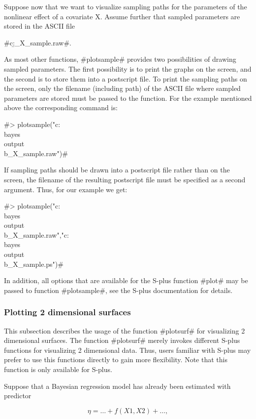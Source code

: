 Suppose now that we want to visualize sampling paths for the
parameters of the nonlinear effect of a covariate X. Assume
further that sampled parameters are stored in the ASCII file

#c:\bayes\output\b_X_sample.raw#.

As most other functions, #plotsample# provides two possibilities
of drawing sampled parameters. The first possibility is to print
the graphs on the screen, and the second is to store them into a
postscript file. To print the sampling paths on the screen, only
the filename (including path) of the ASCII file where sampled
parameters are stored must be passed to the function. For the
example mentioned above the corresponding command is:

#> plotsample("c:\\bayes\\output\\b_X_sample.raw")#

If sampling paths should be drawn into a postscript file rather
than on the screen, the filename of the resulting postscript file
must be specified as a second argument. Thus, for our example we
get:

 #> plotsample("c:\\bayes\\output\\b_X_sample.raw","c:\\bayes\\output\\b_X_sample.ps")#

In addition, all options that are available for the S-plus
function #plot# may be passed to function #plotsample#, see the
S-plus documentation for details.


\subsubsection{Plotting 2 dimensional surfaces}

This subsection describes the usage of the function #plotsurf# for
visualizing 2 dimensional surfaces. The function #plotsurf# merely
invokes different S-plus functions for visualizing 2 dimensional
data. Thus, users familiar with S-plus may prefer to use this
functions directly to gain more flexibility. Note that this function
is only available for S-plus.

Suppose that a Bayesian regression model has already been
estimated with predictor

$$
\eta = \dots + f(X1,X2) + \dots,
$$

